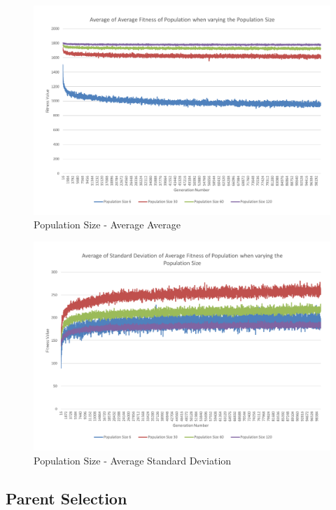 \begin{figure}[thbp]
	\centerline{\includegraphics[width=\paperwidth]{figures/CircleTests/CircleTestsPopulationAverageAverage.pdf}}
	\caption{Population Size - Average Average}
\end{figure}

\begin{figure}[thbp]
	\centerline{\includegraphics[width=\paperwidth]{figures/CircleTests/CircleTestsPopulationAverageStandardDeviation.pdf}}
	\caption{Population Size - Average Standard Deviation}
\end{figure}

\clearpage

\subsection{Parent Selection} %
\label{sub:parent_selection}

